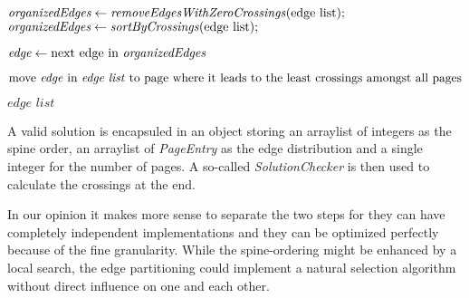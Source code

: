 \documentclass[11pt]{article}
\begin{document}
\begin{algorithm}
	\ContinuedFloat
	\begin{algorithmic}
		
		
		\State $\textit{organizedEdges} \gets \text{\textit{removeEdgesWithZeroCrossings}(edge list)};$
		\State $\textit{organizedEdges} \gets \text{\textit{sortByCrossings}(edge list)};$

		\State$\textit{edge} \gets \text{next edge in \textit{organizedEdges}} $
		
		\State$\text{move \textit{edge} in \textit{edge list} to page where it leads to the least crossings amongst all pages}$
		\EndWhile
		
		\Return $\textit{edge list}$
		\EndFunction
	\end{algorithmic}
\end{algorithm}
\pagebreak
\newline
A valid solution is encapsuled in an object storing an arraylist of integers as the spine order, an arraylist of \textit{PageEntry} as the edge distribution and a single integer for the number of pages. A so-called \textit{SolutionChecker} is then used to calculate the crossings at the end.

In our opinion it makes more sense to separate the two steps for they can have completely independent implementations and they can be optimized perfectly because of the fine granularity. While the spine-ordering might be enhanced by a local search, the edge partitioning could implement a natural selection algorithm without direct influence on one and each other.
\end{document}
